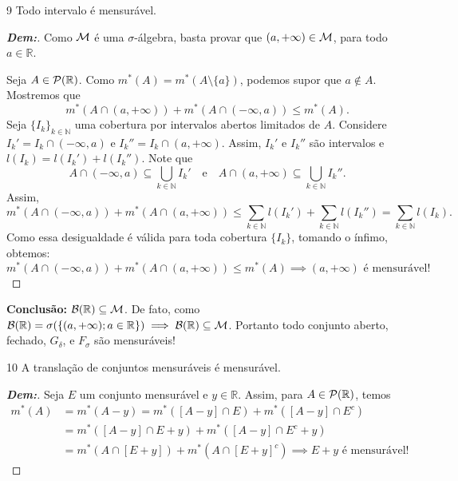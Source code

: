 \begin{prop*}{9}
Todo intervalo é mensurável.
\end{prop*}{}

\begin{proof}[\textbf{Dem:}]
Como $\mathcal{M}$ é uma $\sigma$-álgebra, basta provar que $(a, +\infty) \in \mathcal{M}$, 
 para todo $a \in \mathbb{R}$.

Seja $A \in \mathcal{P}(\mathbb{R})$. Como $m^*(A) = m^*(A \setminus \{a\})$, podemos supor que $a \notin A$. Mostremos que
$$ m^*(A \cap (a, +\infty)) + m^*(A \cap (-\infty, a)) \le m^*(A). $$
Seja $\{I_k\}_{k \in \mathbb{N}}$ uma cobertura por intervalos abertos limitados de $A$. Considere $I_k' = I_k \cap (-\infty, a)$ e $I_k'' = I_k \cap (a, +\infty)$.
Assim, $I_k'$ e $I_k''$ são intervalos e $l(I_k) = l(I_k') + l(I_k'')$.
Note que 
$$ A \cap (-\infty, a) \subseteq \bigcup_{k \in \mathbb{N}} I_k' \quad \text{e} \quad A \cap (a, +\infty) \subseteq \bigcup_{k \in \mathbb{N}} I_k''. $$
Assim,
$$ m^*(A \cap (-\infty, a)) + m^*(A \cap (a, +\infty)) \le \sum_{k \in \mathbb{N}} l(I_k') + \sum_{k \in \mathbb{N}} l(I_k'') = \sum_{k \in \mathbb{N}} l(I_k). $$
Como essa desigualdade é válida para toda cobertura $\{I_k\}$, tomando o ínfimo, obtemos:
$$ m^*(A \cap (-\infty, a)) + m^*(A \cap (a, +\infty)) \le m^*(A) \implies (a, +\infty) \text{ é mensurável!} $$
\end{proof}

\noindent
\textbf{Conclusão:} $\mathcal{B}(\mathbb{R}) \subseteq \mathcal{M}$.
De fato, como $\mathcal{B}(\mathbb{R}) = \sigma(\{(a, +\infty) ; a \in \mathbb{R}\}) \implies \mathcal{B}(\mathbb{R}) \subseteq \mathcal{M}$. 
Portanto todo conjunto aberto, fechado, $G_\delta$, e $F_\sigma$ são mensuráveis!

\begin{prop*}{10}
A translação de conjuntos mensuráveis é mensurável.
\end{prop*}{}

\begin{proof}[\textbf{Dem:}]
Seja $E$ um conjunto mensurável e $y \in \mathbb{R}$. Assim, para $A \in \mathcal{P}(\mathbb{R})$, temos
\begin{align*}
m^*(A) &= m^*(A - y) = m^*([A - y] \cap E) + m^*([A - y] \cap E^c) \\
&= m^*([A - y] \cap E + y) + m^*([A - y] \cap E^c + y) \\
&= m^*(A \cap [E + y]) + m^*(A \cap [E + y]^c) \implies E + y \text{ é mensurável!}
\end{align*}
\end{proof}

